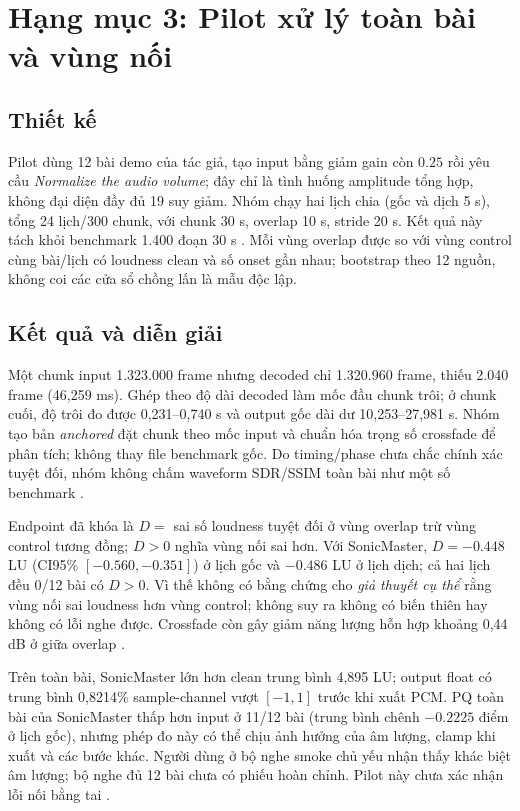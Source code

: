 \documentclass[10pt,a4paper]{article}
\begin{document}
\section{Hạng mục 3: Pilot xử lý toàn bài và vùng nối}
\subsection{Thiết kế}
Pilot dùng 12 bài demo của tác giả, tạo input bằng giảm gain còn $0.25$ rồi yêu cầu \emph{Normalize the audio volume}; đây chỉ là tình huống amplitude tổng hợp, không đại diện đầy đủ 19 suy giảm. Nhóm chạy hai lịch chia (gốc và dịch 5 s), tổng 24 lịch/300 chunk, với chunk 30 s, overlap 10 s, stride 20 s. Kết quả này tách khỏi benchmark 1.400 đoạn 30 s \cite{join}. Mỗi vùng overlap được so với vùng control cùng bài/lịch có loudness clean và số onset gần nhau; bootstrap theo 12 nguồn, không coi các cửa sổ chồng lấn là mẫu độc lập.

\subsection{Kết quả và diễn giải}
Một chunk input 1.323.000 frame nhưng decoded chỉ 1.320.960 frame, thiếu 2.040 frame (46,259 ms). Ghép theo độ dài decoded làm mốc đầu chunk trôi; ở chunk cuối, độ trôi đo được 0,231--0,740 s và output gốc dài dư 10,253--27,981 s. Nhóm tạo bản \emph{anchored} đặt chunk theo mốc input và chuẩn hóa trọng số crossfade để phân tích; không thay file benchmark gốc. Do timing/phase chưa chắc chính xác tuyệt đối, nhóm không chấm waveform SDR/SSIM toàn bài như một số benchmark \cite{join}.

Endpoint đã khóa là $D=$ sai số loudness tuyệt đối ở vùng overlap trừ vùng control tương đồng; $D>0$ nghĩa vùng nối sai hơn. Với SonicMaster, $D=-0.448$ LU (CI95\% $[-0.560,-0.351]$) ở lịch gốc và $-0.486$ LU ở lịch dịch; cả hai lịch đều 0/12 bài có $D>0$. Vì thế không có bằng chứng cho \emph{giả thuyết cụ thể} rằng vùng nối sai loudness hơn vùng control; không suy ra không có biến thiên hay không có lỗi nghe được. Crossfade còn gây giảm năng lượng hỗn hợp khoảng 0,44 dB ở giữa overlap \cite{join}.

Trên toàn bài, SonicMaster lớn hơn clean trung bình 4,895 LU; output float có trung bình 0,8214\% sample-channel vượt $[-1,1]$ trước khi xuất PCM. PQ toàn bài của SonicMaster thấp hơn input ở 11/12 bài (trung bình chênh $-0.2225$ điểm ở lịch gốc), nhưng phép đo này có thể chịu ảnh hưởng của âm lượng, clamp khi xuất và các bước khác. Người dùng ở bộ nghe smoke chủ yếu nhận thấy khác biệt âm lượng; bộ nghe đủ 12 bài chưa có phiếu hoàn chỉnh. Pilot này chưa xác nhận lỗi nối bằng tai \cite{join}.
\end{document}
